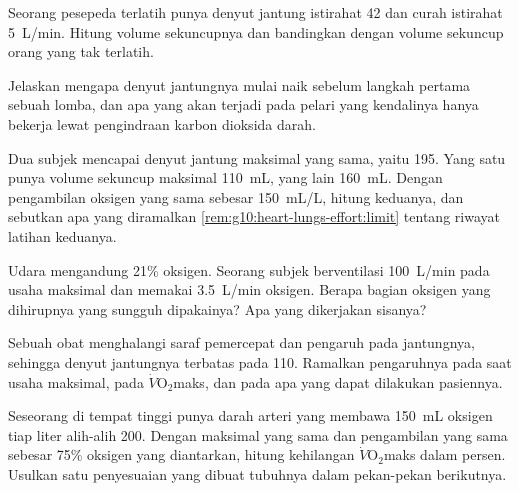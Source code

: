 \begin{exercise}[$\star\star$]\label{exo:g10:heart-lungs-effort:10}
Seorang pesepeda terlatih punya denyut jantung istirahat 42 dan curah
istirahat \qty{5}{L/min}. Hitung volume sekuncupnya dan bandingkan
dengan volume sekuncup orang yang tak terlatih.
\end{exercise}

\begin{exercise}[$\star\star$]\label{exo:g10:heart-lungs-effort:11}
Jelaskan mengapa denyut jantungnya mulai naik sebelum langkah pertama
sebuah lomba, dan apa yang akan terjadi pada pelari yang kendalinya
hanya bekerja lewat pengindraan karbon dioksida darah.
\end{exercise}

\begin{exercise}[$\star\star\star$]\label{exo:g10:heart-lungs-effort:12}
Dua subjek mencapai denyut jantung maksimal yang sama, yaitu 195. Yang
satu punya volume sekuncup maksimal \qty{110}{mL}, yang lain
\qty{160}{mL}. Dengan pengambilan oksigen yang sama sebesar
\qty{150}{mL/L}, hitung  keduanya, dan
sebutkan apa yang diramalkan \cref{rem:g10:heart-lungs-effort:limit}
tentang riwayat latihan keduanya.
\end{exercise}

\begin{exercise}[$\star\star\star$]\label{exo:g10:heart-lungs-effort:13}
Udara mengandung 21\% oksigen. Seorang subjek berventilasi
\qty{100}{L/min} pada usaha maksimal dan memakai \qty{3.5}{L/min}
oksigen. Berapa bagian oksigen yang dihirupnya yang sungguh dipakainya?
Apa yang dikerjakan sisanya?
\end{exercise}

\begin{exercise}[$\star\star\star$]\label{exo:g10:heart-lungs-effort:14}
Sebuah obat menghalangi saraf pemercepat dan pengaruh  pada
jantungnya, sehingga denyut jantungnya terbatas pada 110. Ramalkan
pengaruhnya pada  saat usaha maksimal, pada
$\dot V\!\mathrm{O_2}$maks, dan pada apa yang dapat dilakukan pasiennya.
\end{exercise}

\begin{exercise}[$\star\star\star$]\label{exo:g10:heart-lungs-effort:15}
Seseorang di tempat tinggi punya darah arteri yang membawa
\qty{150}{mL} oksigen tiap liter alih-alih \num{200}. Dengan  maksimal yang sama dan pengambilan yang sama sebesar 75\%
oksigen yang diantarkan, hitung kehilangan $\dot V\!\mathrm{O_2}$maks
dalam persen. Usulkan satu penyesuaian yang dibuat tubuhnya dalam
pekan-pekan berikutnya.
\end{exercise}

